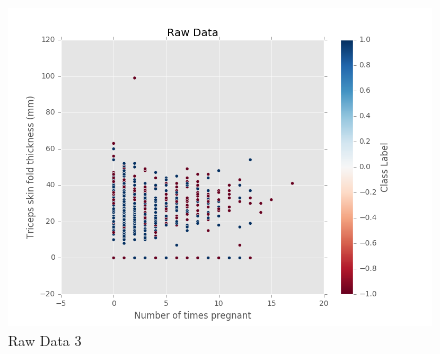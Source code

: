 \documentclass[12pt]{article}
\begin{document}
\begin{figure}[H]
\begin{center}
\includegraphics[scale=0.66]{graph3.png}
\caption{Raw Data 3}
\label{Raw Data 3}
\end{center}
\end{figure}
\end{document}
